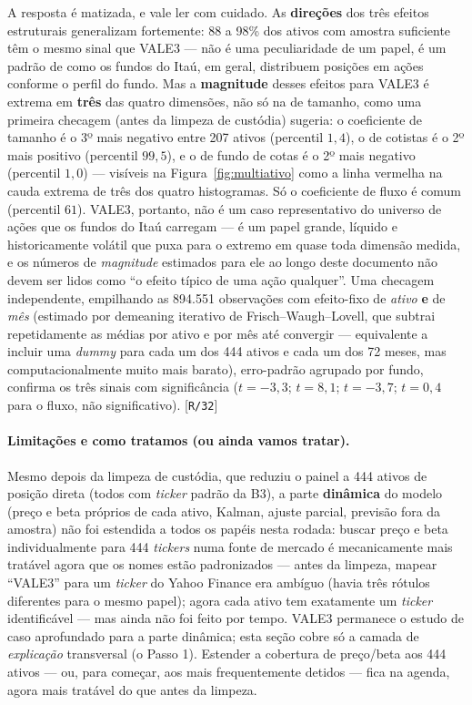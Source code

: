 \documentclass[11pt,a4paper]{article}
\newcommand{\limitacoes}[0]{\paragraph{Limitações e como tratamos (ou ainda vamos tratar).}}
\newcommand{\scriptref}[1]{{\footnotesize\color{cinza}[\texttt{#1}]}}
\begin{document}
A resposta é matizada, e vale ler com cuidado. As \textbf{direções} dos três efeitos estruturais
generalizam fortemente: 88 a 98\% dos ativos com amostra suficiente têm o mesmo sinal que VALE3
--- não é uma peculiaridade de um papel, é um padrão de como os fundos do Itaú, em geral,
distribuem posições em ações conforme o perfil do fundo. Mas a \textbf{magnitude} desses efeitos
para VALE3 é extrema em \textbf{três} das quatro dimensões, não só na de tamanho, como uma
primeira checagem (antes da limpeza de custódia) sugeria: o coeficiente de tamanho é o 3º mais
negativo entre 207 ativos (percentil $1{,}4$), o de cotistas é o 2º mais positivo (percentil
$99{,}5$), e o de fundo de cotas é o 2º mais negativo (percentil $1{,}0$) --- visíveis na
Figura~\ref{fig:multiativo} como a linha vermelha na cauda extrema de três dos quatro
histogramas. Só o coeficiente de fluxo é comum (percentil $61$). VALE3, portanto, não é um caso
representativo do universo de ações que os fundos do Itaú carregam --- é um papel grande, líquido
e historicamente volátil que puxa para o extremo em quase toda dimensão medida, e os números de
\emph{magnitude} estimados para ele ao longo deste documento não devem ser lidos como ``o efeito
típico de uma ação qualquer''. Uma checagem independente, empilhando as 894.551
observações com efeito-fixo de \emph{ativo} \textbf{e} de \emph{mês} (estimado por
demeaning iterativo de Frisch--Waugh--Lovell, que subtrai repetidamente as médias por ativo e por
mês até convergir --- equivalente a incluir uma \emph{dummy} para cada um dos 444 ativos e cada
um dos 72 meses, mas computacionalmente muito mais barato), erro-padrão agrupado por fundo,
confirma os três sinais com significância ($t=-3{,}3$; $t=8{,}1$; $t=-3{,}7$; $t=0{,}4$ para o
fluxo, não significativo). \scriptref{R/32}

\limitacoes Mesmo depois da limpeza de custódia, que reduziu o painel a 444 ativos de posição
direta (todos com \emph{ticker} padrão da B3), a parte \textbf{dinâmica} do modelo (preço e beta
próprios de cada ativo, Kalman, ajuste parcial, previsão fora da amostra) não foi estendida a
todos os papéis nesta rodada: buscar preço e beta individualmente para 444 \emph{tickers} numa
fonte de mercado é mecanicamente mais tratável agora que os nomes estão padronizados --- antes da
limpeza, mapear ``VALE3'' para um \emph{ticker} do Yahoo Finance era ambíguo (havia três rótulos
diferentes para o mesmo papel); agora cada ativo tem exatamente um \emph{ticker} identificável ---
mas ainda não foi feito por tempo. VALE3 permanece o estudo de caso aprofundado para a parte
dinâmica; esta seção cobre só a camada de \emph{explicação} transversal (o Passo 1). Estender a
cobertura de preço/beta aos 444 ativos --- ou, para começar, aos mais frequentemente detidos ---
fica na agenda, agora mais tratável do que antes da limpeza.
\end{document}
